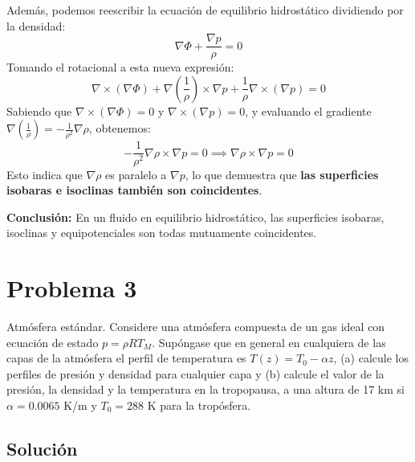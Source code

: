 \documentclass[a4paper]{article}
\begin{document}
Además, podemos reescribir la ecuación de equilibrio hidrostático dividiendo por la densidad:
$$ \nabla \Phi + \frac{\nabla p}{\rho} = 0 $$
Tomando el rotacional a esta nueva expresión:
$$ \nabla \times (\nabla \Phi) + \nabla \left( \frac{1}{\rho} \right) \times \nabla p + \frac{1}{\rho} \nabla \times (\nabla p) = 0 $$
Sabiendo que $\nabla \times (\nabla \Phi) = 0$ y $\nabla \times (\nabla p) = 0$, y evaluando el gradiente $\nabla \left( \frac{1}{\rho} \right) = -\frac{1}{\rho^2} \nabla \rho$, obtenemos:
$$ -\frac{1}{\rho^2} \nabla \rho \times \nabla p = 0 \implies \nabla \rho \times \nabla p = 0 $$
Esto indica que $\nabla \rho$ es paralelo a $\nabla p$, lo que demuestra que \textbf{las superficies isobaras e isoclinas también son coincidentes}.

\textbf{Conclusión:} En un fluido en equilibrio hidrostático, las superficies isobaras, isoclinas y equipotenciales son todas mutuamente coincidentes.


\section{Problema 3}

Atmósfera estándar. Considere una atmósfera compuesta de un gas ideal con ecuación de estado $p= \rho R T_M$. Supóngase que en general en cualquiera de las capas de la atmósfera el perfil de temperatura es $T(z)= T_0 - \alpha z$, (a) calcule los perfiles de presión y densidad para cualquier capa y (b) calcule el valor de la presión, la densidad y la temperatura en la tropopausa, a una altura de 17 km si $\alpha= 0.0065$ K/m y $T_0= 288$ K para la tropósfera.



\subsection{Solución}
\end{document}

